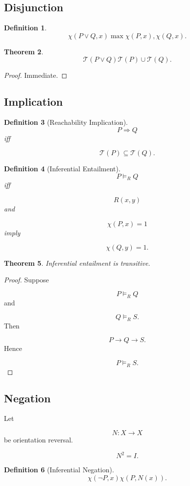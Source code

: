 \documentclass[12pt]{article}
\newtheorem{theorem}{Theorem}[section]
\newtheorem{definition}[theorem]{Definition}
\theoremstyle{remark}
\begin{document}
\subsection{Disjunction}

\begin{definition}
\[
\chi(P\vee Q,x)
\max
{
\chi(P,x),
\chi(Q,x)
}.
\]
\end{definition}

\begin{theorem}
\[
\mathcal T(P\vee Q)
\mathcal T(P)
\cup
\mathcal T(Q).
\]
\end{theorem}

\begin{proof}
Immediate.
\end{proof}

\subsection{Implication}

\begin{definition}[Reachability Implication]
\[
P\Rightarrow Q
\]
iff

\[
\mathcal T(P)
\subseteq
\mathcal T(Q).
\]
\end{definition}
\begin{definition}[Inferential Entailment]
\[
P\models_R Q
\]
iff

\[
R(x,y)
\]
and

\[
\chi(P,x)=1
\]
imply

\[
\chi(Q,y)=1.
\]
\end{definition}
\begin{theorem}
Inferential entailment is transitive.
\end{theorem}

\begin{proof}
Suppose

\[
P\models_R Q
\]
and

\[
Q\models_R S.
\]
Then

\[
P
\rightarrow
Q
\rightarrow
S.
\]
Hence

\[
P\models_R S.
\]
\end{proof}
\subsection{Negation}

Let

\[
N:X\rightarrow X
\]
be orientation reversal.

\[
N^2=I.
\]
\begin{definition}[Inferential Negation]
\[
\chi(\neg P,x)
\chi(P,N(x)).
\]
\end{definition}
\end{document}
